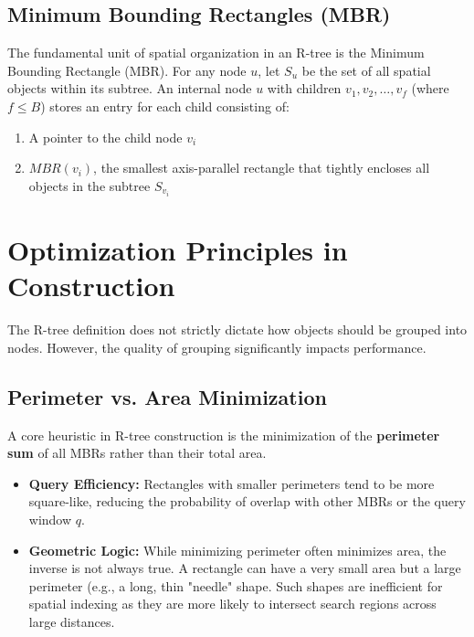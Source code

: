\documentclass[a4paper, 10pt, titlepage]{report}
\begin{document}
\subsection{Minimum Bounding Rectangles (MBR)}
The fundamental unit of spatial organization in an R-tree is the Minimum Bounding Rectangle (MBR). For any node $u$, let $S_u$ be the set of all spatial objects within its subtree. An internal node $u$ with children $v_1, v_2, \dots, v_f$ (where $f \le B$) stores an entry for each child consisting of:
\begin{enumerate}
    \item A pointer to the child node $v_i$
    \item $MBR(v_i)$, the smallest axis-parallel rectangle that tightly encloses all objects in the subtree $S_{v_i}$
\end{enumerate}





\section{Optimization Principles in Construction}
The R-tree definition does not strictly dictate how objects should be grouped into nodes. However, the quality of grouping significantly impacts performance.

\subsection{Perimeter vs. Area Minimization}
A core heuristic in R-tree construction is the minimization of the \textbf{perimeter sum} of all MBRs rather than their total area. 
\begin{itemize}
    \item \textbf{Query Efficiency:} Rectangles with smaller perimeters tend to be more square-like, reducing the probability of overlap with other MBRs or the query window $q$.
    \item \textbf{Geometric Logic:} While minimizing perimeter often minimizes area, the inverse is not always true. A rectangle can have a very small area but a large perimeter (e.g., a long, thin "needle" shape. Such shapes are inefficient for spatial indexing as they are more likely to intersect search regions across large distances.
\end{itemize}
\end{document}
